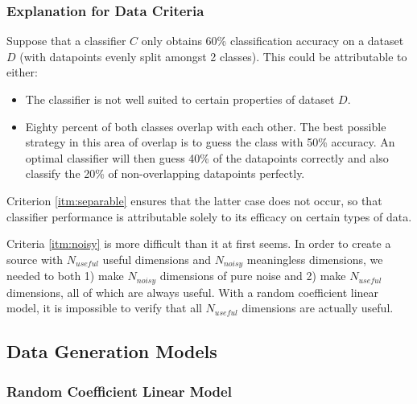 \documentclass{article}
\begin{document}
\subsubsection*{Explanation for Data Criteria}

Suppose that a classifier $C$ only obtains 60\% classification accuracy on a
dataset $D$ (with datapoints evenly split amongst 2 classes). This could be
attributable to either:
\begin{itemize}
    \item The classifier is not well suited to certain properties of dataset
        $D$.
    \item Eighty percent of both classes overlap with each other. The best
        possible strategy in this area of overlap is to guess the class with
        50\% accuracy. An optimal classifier will then guess 40\% of the
        datapoints correctly and also classify the 20\% of non-overlapping
        datapoints perfectly.
\end{itemize}
Criterion \ref{itm:separable} ensures that the latter case does not occur,
so that classifier performance is attributable solely to its efficacy on
certain types of data.

Criteria \ref{itm:noisy} is more difficult than it at first seems. In
order to create a source with $N_{useful}$ useful dimensions and $N_{noisy}$
meaningless dimensions, we needed to both 1) make $N_{noisy}$ dimensions of
pure noise and 2) make $N_{useful}$ dimensions, all of which are always useful.
With a random coefficient linear model, it is impossible to verify that all
$N_{useful}$ dimensions are actually useful.



\subsection*{Data Generation Models}

\subsubsection*{Random Coefficient Linear Model}
\end{document}
